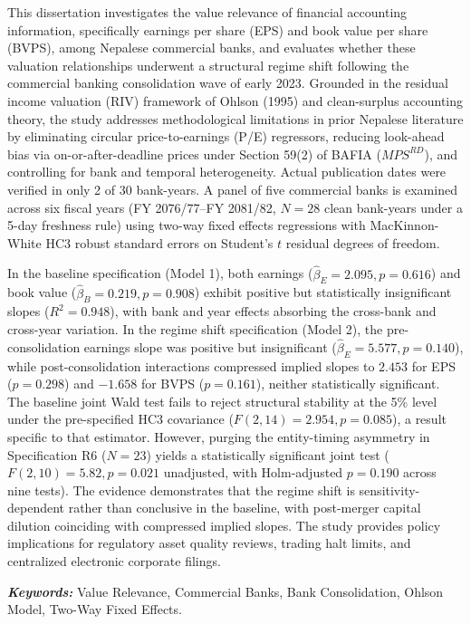 \clearpage
{}
\thispagestyle{plain}

\vspace{0.1cm}

\setlength{\parskip}{2pt}
This dissertation investigates the value relevance of financial accounting information, specifically earnings per share (EPS) and book value per share (BVPS), among Nepalese commercial banks, and evaluates whether these valuation relationships underwent a structural regime shift following the commercial banking consolidation wave of early 2023. Grounded in the residual income valuation (RIV) framework of Ohlson (1995) and clean-surplus accounting theory, the study addresses methodological limitations in prior Nepalese literature by eliminating circular price-to-earnings (P/E) regressors, reducing look-ahead bias via on-or-after-deadline prices under Section 59(2) of BAFIA ($\mathit{MPS}^{RD}$), and controlling for bank and temporal heterogeneity. Actual publication dates were verified in only 2 of 30 bank-years. A panel of five commercial banks is examined across six fiscal years (FY 2076/77--FY 2081/82, $N = 28$ clean bank-years under a 5-day freshness rule) using two-way fixed effects regressions with MacKinnon-White HC3 robust standard errors on Student's $t$ residual degrees of freedom.

In the baseline specification (Model 1), both earnings ($\hat{\beta}_E = 2.095, p = 0.616$) and book value ($\hat{\beta}_B = 0.219, p = 0.908$) exhibit positive but statistically insignificant slopes ($R^2 = 0.948$), with bank and year effects absorbing the cross-bank and cross-year variation. In the regime shift specification (Model 2), the pre-consolidation earnings slope was positive but insignificant ($\hat{\beta}_E = 5.577, p = 0.140$), while post-consolidation interactions compressed implied slopes to $2.453$ for EPS ($p = 0.298$) and $-1.658$ for BVPS ($p = 0.161$), neither statistically significant. The baseline joint Wald test fails to reject structural stability at the 5\% level under the pre-specified HC3 covariance ($F(2, 14) = 2.954, p = 0.085$), a result specific to that estimator. However, purging the entity-timing asymmetry in Specification R6 ($N = 23$) yields a statistically significant joint test ($F(2, 10) = 5.82, p = 0.021$ unadjusted, with Holm-adjusted $p = 0.190$ across nine tests). The evidence demonstrates that the regime shift is sensitivity-dependent rather than conclusive in the baseline, with post-merger capital dilution coinciding with compressed implied slopes. The study provides policy implications for regulatory asset quality reviews, trading halt limits, and centralized electronic corporate filings.

\vspace{4pt}

\noindent
\textbf{\textit{Keywords:}} Value Relevance, Commercial Banks, Bank Consolidation, Ohlson Model, Two-Way Fixed Effects.

